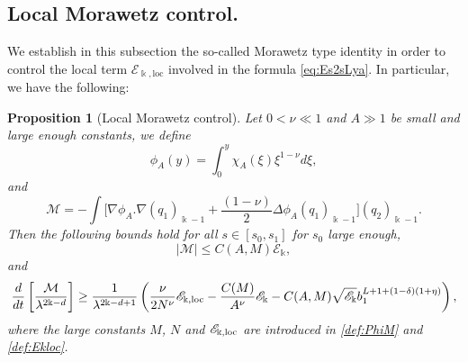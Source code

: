 \documentclass[11pt]{aims}
\newtheorem{proposition}[theorem]{Proposition}
\theoremstyle{definition}
\numberwithin{equation}{section}
\begin{document}
\subsection{Local Morawetz control.}
We establish in this subsection the so-called Morawetz type identity in order to control the local term ${\mathscr{E}}_{\Bbbk, \text{loc}}$ involved in the formula \eqref{eq:Es2sLya}. In particular, we have the following:
\begin{proposition}[Local Morawetz control] \label{prop:Mcon} Let $0 < \nu \ll 1$ and $A \gg 1$ be small and large enough constants, we define
\begin{equation}\label{def:phiA}
\phi_A(y) = \int_0^y \chi_A(\xi)\xi^{1 - \nu}d\xi,
\end{equation}
and 
\begin{equation}\label{def:Mofun}
{\mathcal{M}} = - \int \big[\nabla \phi_A . \nabla (q_1)_{\Bbbk - 1} + \frac{(1 - \nu)}{2}\Delta \phi_A (q_1)_{\Bbbk- 1} \big](q_2)_{\Bbbk - 1}.
\end{equation}
Then the following bounds hold for all $s \in [s_0, s_1]$ for $s_0$ large enough,
\begin{equation}\label{est:Mbound}
|{\mathcal{M}}| \leq C(A,M){\mathscr{E}}_\Bbbk,
\end{equation}
and
\begin{equation}\label{est:Mcontrol}
\frac{d}{dt}\left[\frac{\mathcal{M}}{\lambda^{2\Bbbk - d}}\right] \geq \frac{1}{\lambda^{2\Bbbk - d + 1}}\left( \frac{\nu}{2N^\nu}{\mathscr{E}}_{\Bbbk,\textup{loc}} - \frac{C(M)}{A^\nu} {\mathscr{E}}_\Bbbk - C(A,M)\sqrt{{\mathscr{E}}_\Bbbk}b_1^{L + 1 + (1 - \delta)(1 + \eta)}\right),
\end{equation}
where the large constants $M$, $N$ and ${\mathscr{E}}_{\Bbbk,\textup{loc}}$ are introduced in \eqref{def:PhiM} and \eqref{def:Ekloc}.
\end{proposition}
\end{document}
